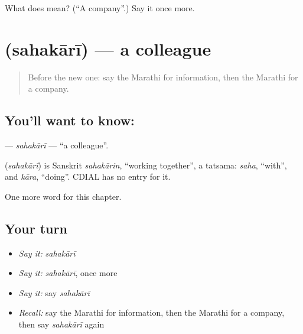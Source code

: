 \begin{tcolorbox}[breakable,colback=teal!4,colframe=teal!35!black,title={Before you move on}]
What does  mean? (\textquotedblleft{}A company\textquotedblright{}.) Say it once more.
\end{tcolorbox}
\section[\texorpdfstring{\mr{सहकारी} (sahakārī)}{सहकारी (sahakārī)}]{ (sahakārī) — a colleague}

\label{lesson:MR-C192-sahakari}



\begin{quote}
Before the new one: say the Marathi for information, then the Marathi for a company.
\end{quote}

\subsection*{You'll want to know: }
\textbf{} — \emph{sahakārī} — \textquotedblleft{}a colleague\textquotedblright{}.

\begin{cousinweb}
\textbf{} (\emph{sahakārī}) is Sanskrit \emph{sahakārin}, \textquotedblleft{}working together\textquotedblright{}, a tatsama: \emph{saha}, \textquotedblleft{}with\textquotedblright{}, and \emph{kāra}, \textquotedblleft{}doing\textquotedblright{}. CDIAL has no entry for it.
\end{cousinweb}

\begin{grammarlens}[title={What you've built}]
One more word for this chapter.
\end{grammarlens}

\subsection*{Your turn}
\begin{itemize}
\raggedright
  \item \emph{Say it:} \emph{sahakārī}
  \item \emph{Say it:} \emph{sahakārī}, once more
  \item \emph{Say it:} say \emph{sahakārī}
  \item \emph{Recall:} say the Marathi for information, then the Marathi for a company, then say \emph{sahakārī} again
\end{itemize}

